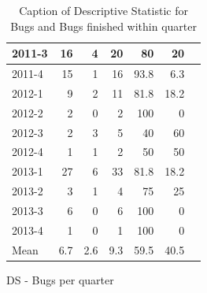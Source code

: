 \documentclass[UKenglish]{ifimaster}  %
\begin{document}
\begin{appendices}
\begin{table}[!htbp]
\begin{adjustwidth}{-3cm}{}
\begin{subfigure}[b]{0.3\textwidth}
{\begin{tabular}{ | l | r | r | r | r | r | r | }
2011-3 & 16 & 4 & 20 & 80 & 20 \\ \hline
2011-4 & 15 & 1 & 16 & 93.8 & 6.3 \\ \hline
2012-1 & 9 & 2 & 11 & 81.8 & 18.2 \\ \hline
2012-2 & 2 & 0 & 2 & 100 & 0 \\ \hline
2012-3 & 2 & 3 & 5 & 40 & 60 \\ \hline
2012-4 & 1 & 1 & 2 & 50 & 50 \\ \hline
2013-1 & 27 & 6 & 33 & 81.8 & 18.2 \\ \hline
2013-2 & 3 & 1 & 4 & 75 & 25 \\ \hline
2013-3 & 6 & 0 & 6 & 100 & 0 \\ \hline
2013-4 & 1 & 0 & 1 & 100 & 0 \\ \hline
Mean &6.7&2.6&9.3&59.5&40.5 \\ \hline

\end{tabular}
}
\caption{DS - Bugs per quarter}
 \label{DS:FTPQ:8}
\end{subfigure}
\end{adjustwidth}
\caption[Optional caption for list of figures]{Caption of Descriptive Statistic for Bugs and Bugs finished within quarter}
\label{DS:8:5} %
\end{table}


\end{appendices}
\end{document}
